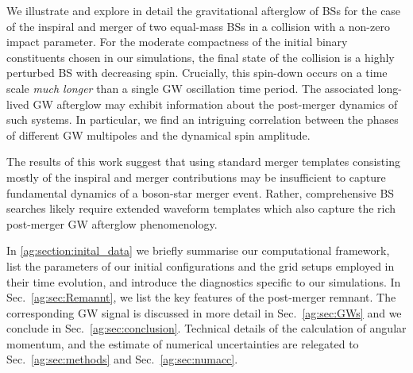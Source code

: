 We illustrate and explore in detail the gravitational afterglow
of BSs for the case of the inspiral and merger
of two equal-mass BSs in a collision with a non-zero impact parameter. For the moderate compactness of the initial binary constituents chosen in our simulations, the final state of the collision
is a highly perturbed BS with decreasing spin. Crucially, this spin-down occurs on a time scale {\it much longer} than a single GW oscillation time period.  The associated long-lived GW afterglow may exhibit information about the post-merger dynamics of such systems. In particular, we find an intriguing correlation between the phases of different GW multipoles and the dynamical spin amplitude.



The results of this work suggest that using standard merger templates consisting mostly of the inspiral and merger contributions may be insufficient to capture fundamental dynamics of a boson-star merger event. Rather, comprehensive BS searches likely require extended waveform templates which also capture the rich post-merger GW afterglow phenomenology.

In \ref{ag:section:inital_data} we
briefly summarise our computational framework, list the parameters
of our initial configurations and the grid setups employed in their
time evolution, and introduce the diagnostics specific
to our simulations. In Sec.~\ref{ag:sec:Remannt},
we list the key features of the post-merger
remnant. The corresponding GW signal is discussed in more detail
in Sec.~\ref{ag:sec:GWs} and we conclude in Sec.~\ref{ag:sec:conclusion}.
Technical details of the calculation
of angular momentum, and the estimate of numerical uncertainties
are relegated to
Sec.~\ref{ag:sec:methods} and Sec.~\ref{ag:sec:numacc}.

